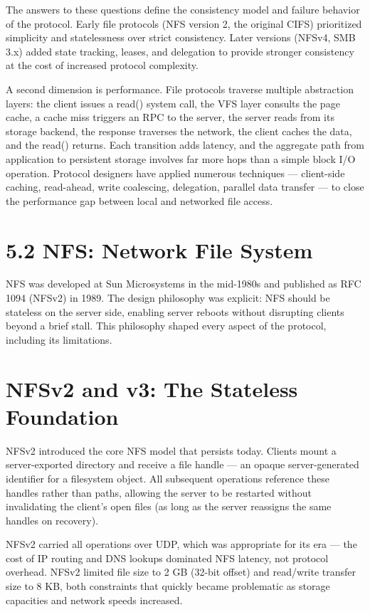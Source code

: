 The answers to these questions define the consistency model and failure behavior of the protocol. Early file protocols (NFS version 2, the original CIFS) prioritized simplicity and statelessness over strict consistency. Later versions (NFSv4, SMB 3.x) added state tracking, leases, and delegation to provide stronger consistency at the cost of increased protocol complexity.

A second dimension is performance. File protocols traverse multiple abstraction layers: the client issues a read() system call, the VFS layer consults the page cache, a cache miss triggers an RPC to the server, the server reads from its storage backend, the response traverses the network, the client caches the data, and the read() returns. Each transition adds latency, and the aggregate path from application to persistent storage involves far more hops than a simple block I/O operation. Protocol designers have applied numerous techniques --- client-side caching, read-ahead, write coalescing, delegation, parallel data transfer --- to close the performance gap between local and networked file access.

\section{5.2 NFS: Network File System}
NFS was developed at Sun Microsystems in the mid-1980s and published as RFC 1094 (NFSv2) in 1989. The design philosophy was explicit: NFS should be stateless on the server side, enabling server reboots without disrupting clients beyond a brief stall. This philosophy shaped every aspect of the protocol, including its limitations.

\section{NFSv2 and v3: The Stateless Foundation}
NFSv2 introduced the core NFS model that persists today. Clients mount a server-exported directory and receive a file handle --- an opaque server-generated identifier for a filesystem object. All subsequent operations reference these handles rather than paths, allowing the server to be restarted without invalidating the client's open files (as long as the server reassigns the same handles on recovery).

NFSv2 carried all operations over UDP, which was appropriate for its era --- the cost of IP routing and DNS lookups dominated NFS latency, not protocol overhead. NFSv2 limited file size to 2 GB (32-bit offset) and read/write transfer size to 8 KB, both constraints that quickly became problematic as storage capacities and network speeds increased.

